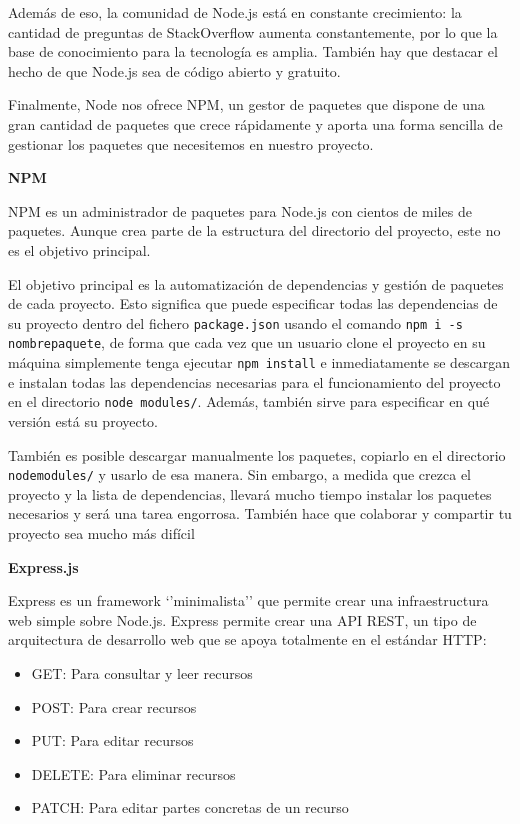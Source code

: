 Además de eso, la comunidad de Node.js está en constante crecimiento: la cantidad de preguntas de StackOverflow aumenta constantemente, por lo que la base de conocimiento para la tecnología es amplia. También hay que destacar el hecho de que Node.js sea de código abierto y gratuito. 

Finalmente, Node nos ofrece NPM, un gestor de paquetes que dispone de una gran cantidad de paquetes que crece rápidamente y aporta una forma sencilla de gestionar los paquetes que necesitemos en nuestro proyecto.

{\bf NPM}

NPM es un administrador de paquetes para Node.js con cientos de miles de paquetes. Aunque crea parte de la estructura del directorio del proyecto, este no es el objetivo principal.

El objetivo principal es la automatización de dependencias y gestión de paquetes de cada proyecto. Esto significa que puede especificar todas las dependencias de su proyecto dentro del fichero \verb|package.json| usando el comando 
\verb|npm i -s nombrepaquete|, de forma que cada vez que un usuario clone el proyecto en su máquina simplemente tenga ejecutar \verb|npm install| e inmediatamente se descargan e instalan todas las dependencias necesarias para el funcionamiento del proyecto en el directorio \verb|node modules/|. Además, también sirve para especificar en qué versión está su proyecto.

También es posible descargar manualmente los paquetes, copiarlo en el directorio \verb|nodemodules/| y usarlo de esa manera. Sin embargo, a medida que crezca el proyecto y la lista de dependencias, llevará mucho tiempo instalar los paquetes necesarios y será una tarea engorrosa. También hace que colaborar y compartir tu proyecto sea mucho más difícil

{\bf Express.js}

Express es un framework ‘’minimalista’’ que permite crear una infraestructura web simple sobre Node.js. Express permite crear una API REST, un tipo de arquitectura de desarrollo web que se apoya totalmente en el estándar HTTP:

\begin{itemize}
  \item GET: Para consultar y leer recursos
  \item POST: Para crear recursos
  \item PUT: Para editar recursos
  \item DELETE: Para eliminar recursos
  \item PATCH: Para editar partes concretas de un recurso
\end{itemize}

